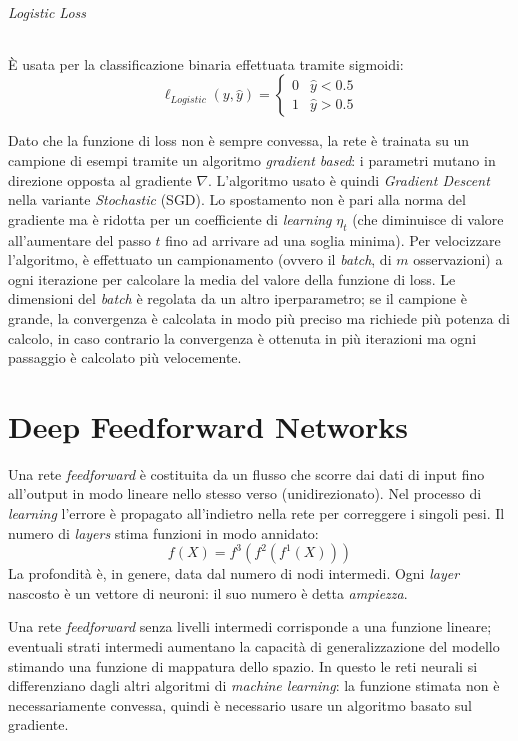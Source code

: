 \documentclass[11pt, a4page]{article}
\begin{document}
\paragraph{Logistic Loss}
È usata per la classificazione binaria effettuata tramite sigmoidi:
\begin{equation*}
  \ell_{Logistic} (y, \hat{y}) = \begin{cases}
    0 & \hat{y} < 0.5 \\
    1 & \hat{y} > 0.5
  \end{cases}
\end{equation*}

Dato che la funzione di loss non è sempre convessa, la rete è trainata su un campione di esempi tramite un algoritmo \textit{gradient based}: i parametri mutano in direzione opposta al gradiente $\nabla$.
L'algoritmo usato è quindi \textit{Gradient Descent} nella variante \textit{Stochastic} (SGD).
Lo spostamento non è pari alla norma del gradiente ma è ridotta per un coefficiente di \textit{learning} $\eta_t$ (che diminuisce di valore all'aumentare del passo $t$ fino ad arrivare ad una soglia minima).
Per velocizzare l'algoritmo, è effettuato un campionamento (ovvero il \textit{batch}, di $m$ osservazioni) a ogni iterazione per calcolare la media del valore della funzione di loss.
Le dimensioni del \textit{batch} è regolata da un altro iperparametro; se il campione è grande, la convergenza è calcolata in modo più preciso ma richiede più potenza di calcolo, in caso contrario la convergenza è ottenuta in più iterazioni ma ogni passaggio è calcolato più velocemente.
\newpage

\part{Deep Feedforward Networks}
Una rete \textit{feedforward} è costituita da un flusso che scorre dai dati di input fino all'output in modo lineare nello stesso verso (unidirezionato).
Nel processo di \textit{learning} l'errore è propagato all'indietro nella rete per correggere i singoli pesi.
Il numero di \textit{layers} stima funzioni in modo annidato:
\begin{equation*}
  f(X) = f^{3}(f^{2}(f^{1}(X)))
\end{equation*}
La profondità è, in genere, data dal numero di nodi intermedi.
Ogni \textit{layer} nascosto è un vettore di neuroni: il suo numero è detta \textit{ampiezza}.

Una rete \textit{feedforward} senza livelli intermedi corrisponde a una funzione lineare; eventuali strati intermedi aumentano la capacità di generalizzazione del modello stimando una funzione di mappatura dello spazio.
In questo le reti neurali si differenziano dagli altri algoritmi di \textit{machine learning}: la funzione stimata non è necessariamente convessa, quindi è necessario usare un algoritmo basato sul gradiente.
\end{document}
